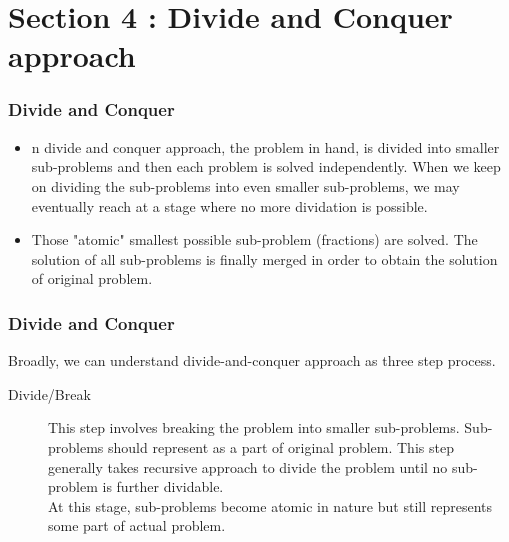 \documentclass{beamer}
\begin{document}
\section{Section 4 : Divide and Conquer approach}
\begin{frame}
\frametitle{Divide and Conquer}
\large
\begin{itemize}
\item n divide and conquer approach, the problem in hand, is divided into smaller sub-problems and then each problem is solved independently. When we keep on dividing the sub-problems into even smaller sub-problems, we may eventually reach at a stage where no more dividation is possible. 
\item Those "atomic" smallest possible sub-problem (fractions) are solved. The solution of all sub-problems is finally merged in order to obtain the solution of original problem.
\end{itemize}
\end{frame}
\begin{frame}
\frametitle{Divide and Conquer}
\large
Broadly, we can understand divide-and-conquer approach as three step process.
\begin{description}
	\item[Divide/Break] This step involves breaking the problem into smaller sub-problems. Sub-problems should represent as a part of original problem. This step generally takes recursive approach to divide the problem until no sub-problem is further dividable. \\ At this stage, sub-problems become atomic in nature but still represents some part of actual problem.
\end{description}


\end{frame}
\end{document}
